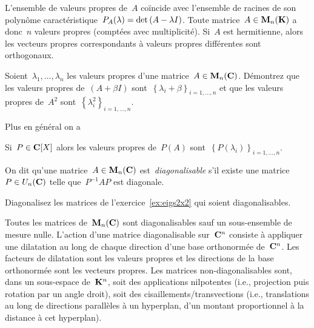 \begin{proposition}
	\label{prp:eigenalgebra}
	L'ensemble de valeurs propres de~$A$ coïncide avec l'ensemble de racines de
	son polynôme caractéristique~$P_A(\lambda)=\mathrm{det}\left(A-\lambda
	I\right)$.  Toute matrice~$A\in\mathbf{M}_n(\mathbf{K})$ a donc~$n$ valeurs propres (comptées
	avec multiplicité).  Si~$A$ est hermitienne, alors les vecteurs propres
	correspondants à valeurs propres différentes sont orthogonaux.
\end{proposition}

\begin{exercice}
	Soient~$\lambda_1,\ldots,\lambda_n$ les valeurs propres d'une
	matrice~$A\in\mathbf{M}_n(\mathbf{C})$.  Démontrez que les valeurs propres de~$(A+\beta I)$
	sont~$\left\{\lambda_i+\beta\right\}_{i=1,\ldots,n}$ et que les valeurs
	propres de~$A^2$ sont~$\left\{\lambda_i^2\right\}_{i=1,\ldots,n}$.
\end{exercice}

Plus en général on a
\begin{proposition}
	Si~$P\in\mathbf{C}[X]$ alors les valeurs propres de~$P(A)$
	sont~$\left\{P(\lambda_i)\right\}_{i=1,\ldots,n}$.
\end{proposition}

On dit qu'une matrice~$A\in\mathbf{M}_n(\mathbf{C})$ est~\emph{diagonalisable} s'il existe
une matrice~$P\in U_n(\mathbf{C})$ telle que~$P^{-1}AP$ est diagonale.

\begin{exercice}
	Diagonalisez les matrices de l'exercice~\ref{ex:eigs2x2} qui soient
	diagonalisables.
\end{exercice}

\begin{proposition}
	Toutes les matrices de~$\mathbf{M}_n(\mathbf{C})$ sont diagonalisables sauf un
	sous-ensemble de mesure nulle.  L'action d'une matrice diagonalisable
	sur~$\mathbf{C}^n$ consiste à appliquer une dilatation au long de chaque direction
	d'une base orthonormée de~$\mathbf{C}^n$.  Les facteurs de dilatation sont les
	valeurs propres et les directions de la base orthonormée sont les vecteurs
	propres.  Les matrices non-diagonalisables sont, dans un sous-espace
	de~$\mathbf{K}^n$, soit des applications nilpotentes (i.e., projection puis
	rotation par un angle droit), soit des cisaillements/transvections
	(i.e., translations au long de directions parallèles à un hyperplan, d'un
	montant proportionnel à la distance à cet hyperplan).
\end{proposition}

